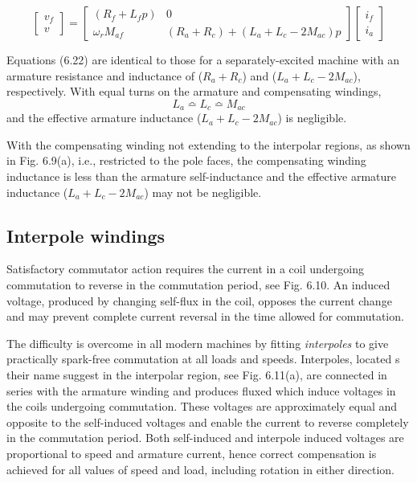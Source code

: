\documentclass[a4paper,numbers=noenddot,12pt]{scrbook}
\begin{document}
\begin{equation}
    \begin{bmatrix}
        v_f \\[2ex] v
    \end{bmatrix} =
    \begin{bmatrix}
        (R_f + L_f p) & 0 \\[2ex]
        \omega_r M_{af} & (R_a + R_c) + (L_a + L_c -2 M_{ac})p
    \end{bmatrix}
    \begin{bmatrix}
        i_f \\[2ex] i_a
    \end{bmatrix}
    \label{}
\end{equation}

Equations (6.22) are identical to those for a separately-excited machine with an armature resistance and inductance of ($R_a + R_c$) and ($L_a + L_c - 2M_{ac}$), respectively. With equal turns on the armature and compensating windings,
\begin{equation*}
    L_a \bumpeq L_c \bumpeq M_{ac}
\end{equation*}
and the effective armature inductance ($L_a + L_c - 2M_{ac}$) is negligible.

With the compensating winding not extending to the interpolar regions, as shown in Fig. 6.9(a), i.e., restricted to the pole faces, the compensating winding inductance is less than the armature self-inductance and the effective armature inductance ($L_a + L_c - 2M_{ac}$) may not be negligible.

\subsection{Interpole windings}
Satisfactory commutator action requires the current in a coil undergoing commutation to reverse in the commutation period, see Fig. 6.10. An induced voltage, produced by changing self-flux in the coil, opposes the current change and may prevent complete current reversal in the time allowed for commutation.

The difficulty is overcome in all modern machines by fitting \textit{interpoles} to give practically spark-free commutation at all loads and speeds. Interpoles, located s their name suggest in the interpolar region, see Fig. 6.11(a), are connected in series with the armature winding and produces fluxed which induce voltages in the coils undergoing commutation. These voltages are approximately equal and opposite to the self-induced voltages and enable the current to reverse
completely in the commutation period. Both self-induced and interpole induced voltages are proportional to speed and armature current, hence correct compensation is achieved for all values of speed and load, including rotation in either direction.
\end{document}
